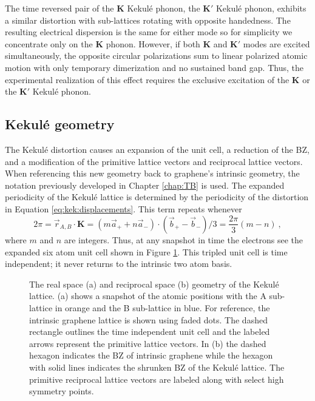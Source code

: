 The time reversed pair of the $\bm{K}$ Kekul\'e phonon, the $\bm{K'}$ Kekul\'e phonon, exhibits a similar distortion with sub-lattices rotating with opposite handedness.
The resulting electrical dispersion is the same for either mode so for simplicity we concentrate only on the $\bm{K}$ phonon.
However, if both $\bm{K}$ and $\bm{K'}$ modes are excited simultaneously, the opposite circular polarizations sum to linear polarized atomic motion with only temporary dimerization and no sustained band gap.
Thus, the experimental realization of this effect requires the exclusive excitation of the $\bm{K}$ or the $\bm{K'}$ Kekul\'e phonon.

\subsection{Kekul\'e geometry}
The Kekul\'e distortion causes an expansion of the unit cell, a reduction of the BZ, and a modification of the primitive lattice vectors and reciprocal lattice vectors.
When referencing this new geometry back to graphene's intrinsic geometry, the notation previously developed in Chapter \ref{chap:TB} is used.
The expanded periodicity of the Kekul\'e lattice is determined by the periodicity of the distortion in Equation \ref{eq:kek:displacements}.
This term repeats whenever 
\begin{equation*}
	2 \pi=\vec{r}_{A,B} \cdot \bm{K}=(m \vec{a}_+ + n \vec{a}_-) \cdot (\vec{b}_+ - \vec{b}_-)/3=\frac{2 \pi}{3} (m-n) \ ,
\end{equation*}
where $m$ and $n$ are integers.
Thus, at any snapshot in time the electrons see the expanded six atom unit cell shown in Figure \ref{fig:kek:geometry}.
This tripled unit cell is time independent; it never returns to the intrinsic two atom basis. 

\begin{figure}
	\begin{center}
	
	\end{center}
	\caption[Geometry of the Kekul\'e lattice]{\label{fig:kek:geometry}
		The real space (a) and reciprocal space (b) geometry of the Kekul\'e lattice.
		(a) shows a snapshot of the atomic positions with the A sub-lattice in orange and the B sub-lattice in blue.	
		For reference, the intrinsic graphene lattice is shown using faded dots.
		The dashed rectangle outlines the time independent unit cell and the labeled arrows represent the primitive lattice vectors.
		In (b) the dashed hexagon indicates the BZ of intrinsic graphene while the hexagon with solid lines indicates the shrunken BZ of the Kekul\'e lattice.
		The primitive reciprocal lattice vectors are labeled along with select high symmetry points.
	}
\end{figure}

